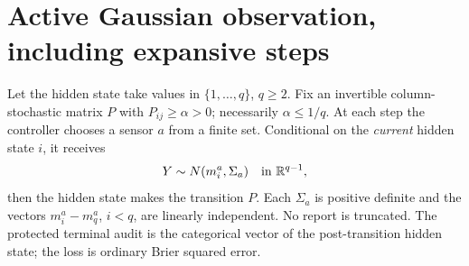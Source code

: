 \section{Active Gaussian observation, including expansive steps}\label{sec:classical}
Let the hidden state take values in $\{1,\ldots,q\}$, $q\ge2$. Fix an invertible column-stochastic matrix $P$ with $P_{ij}\ge\alpha>0$; necessarily $\alpha\le1/q$. At each step the controller chooses a sensor $a$ from a finite set. Conditional on the \emph{current} hidden state $i$, it receives
\[
 Y\sim N(m_i^a,\Sigma_a)\quad\text{in }\mathbb R^{q-1},
\]
then the hidden state makes the transition $P$. Each $\Sigma_a$ is positive definite and the vectors $m_i^a-m_q^a$, $i<q$, are linearly independent. No report is truncated. The protected terminal audit is the categorical vector of the post-transition hidden state; the loss is ordinary Brier squared error.

